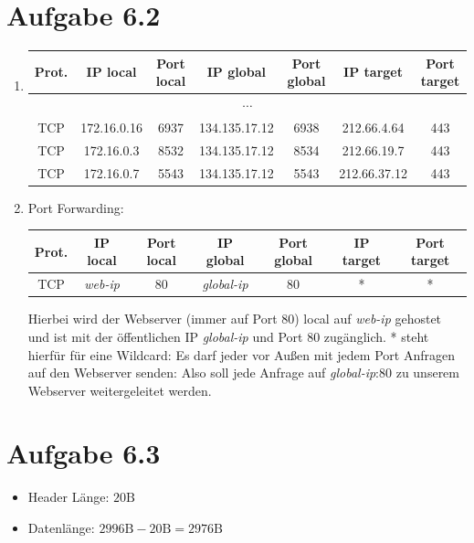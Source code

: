 \documentclass[12pt, a4paper]{article}
\begin{document}
\newpage


\section*{Aufgabe 6.2}
\begin{enumerate}[label=\alph*)]
	\item	\begin{center}\begin{tabular}{c|c|c|c|c|c|c|}
				Prot. & IP local & Port local & IP global & Port global & IP target & Port target \\
				\hline\hline
				\multicolumn{7}{c}{$\cdots$}\\
				\hline
				TCP & 172.16.0.16 & 6937 & 134.135.17.12 & 6938 & 212.66.4.64 & 443 \\
				TCP & 172.16.0.3 & 8532 & 134.135.17.12 & 8534 & 212.66.19.7 & 443 \\
				TCP & 172.16.0.7 & 5543 & 134.135.17.12 & 5543 & 212.66.37.12 & 443 \\
			\end{tabular}\end{center}
	\item	Port Forwarding:
			\begin{center}\begin{tabular}{c|c|c|c|c|c|c|}
				Prot. & IP local & Port local & IP global & Port global & IP target & Port target \\
				\hline\hline
				TCP & \textit{web-ip} & 80 & \textit{global-ip} & 80 & * & * \\
			\end{tabular}\end{center}
			Hierbei wird der Webserver (immer auf Port 80) local auf \textit{web-ip} gehostet und ist mit der öffentlichen IP \textit{global-ip} und Port 80 zugänglich. * steht hierfür für eine Wildcard: Es darf jeder vor Außen mit jedem Port Anfragen auf den Webserver senden: Also soll jede Anfrage auf \textit{global-ip}:80 zu unserem Webserver weitergeleitet werden.
\end{enumerate}


\newpage


\section*{Aufgabe 6.3}
\begin{itemize}
	\item	Header Länge: $20 \text{B}$
	\item	Datenlänge: $2996 \text{B} - 20 \text{B} = 2976 \text{B}$
\end{itemize}
\end{document}
